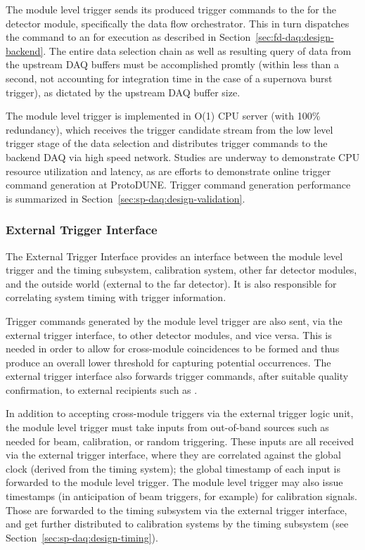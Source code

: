 The module level trigger sends its produced trigger commands to the
 for the detector module, specifically the data flow
orchestrator. This in turn dispatches the command to an  for
execution as described in Section~\ref{sec:fd-daq:design-backend}. The
entire data selection chain as well as resulting query of data from
the upstream DAQ buffers must be 
accomplished promtly (within less than a second, not accounting for
integration time in the case of a supernova burst trigger), as dictated by the upstream DAQ 
buffer size.

The module level trigger is implemented in O(1) CPU server (with 100\%
redundancy), which
receives the trigger candidate stream from the low level trigger stage
of the data selection and distributes trigger commands to the
backend DAQ via high speed network. Studies are
underway to demonstrate CPU resource utilization and latency, as are
efforts to demonstrate online trigger command generation at ProtoDUNE.
Trigger command generation performance is summarized in
Section~\ref{sec:sp-daq:design-validation}.

\subsubsection{External Trigger Interface}

The External Trigger Interface provides an interface between the
module level trigger and the timing subsystem, calibration system,
other far detector modules, and the
outside world (external to the far detector). It is also responsible for correlating system timing with trigger information. 

Trigger commands generated by the module level trigger are also sent,
via the external trigger interface, to other detector modules, and
vice versa. This is needed in order to allow for cross-module
coincidences to be formed and thus produce an overall lower threshold for
capturing potential  occurrences. 
The external trigger interface also forwards  trigger
commands, after suitable quality confirmation, to external recipients
such as .

In addition to accepting cross-module triggers via the external trigger
logic unit, the module level trigger must take inputs from out-of-band sources such as
needed for beam, calibration, or random triggering. These inputs are all
received via the external trigger interface, where they are correlated against the
global clock (derived from the timing system); the global timestamp of
each input is forwarded to the module level trigger. The module level trigger may
also issue timestamps (in anticipation of beam triggers,
for example) for calibration signals. Those are forwarded to the
timing subsystem via the external trigger interface, and get further
distributed to calibration systems by the timing subsystem (see
Section~\ref{sec:sp-daq:design-timing}). 

